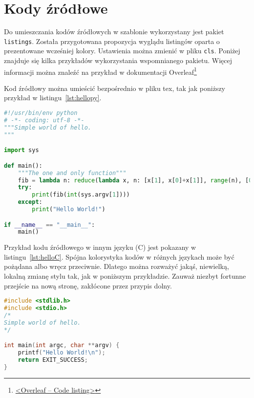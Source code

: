 
\section{Kody źródłowe}
Do umieszczania kodów źródłowych w szablonie wykorzystany jest pakiet \texttt{listings}. Została przygotowana propozycja wyglądu listingów oparta o prezentowane wcześniej kolory. Ustawienia można zmienić w pliku \texttt{cls}. Poniżej znajduje się kilka przykładów wykorzystania wspomnianego pakietu. Więcej informacji można znaleźć na przykład w dokumentacji Overleaf\footnote{\href{https://www.overleaf.com/learn/latex/code_listing}{<Overleaf -- Code listing>}}

Kod źródłowy można umieścić bezpośrednio w pliku tex, tak jak poniższy przykład w listingu~\ref{lst:hellopy}.

\begin{lstlisting}[language=Python,
    caption={Prosty program w języku Python},
    label={lst:hellopy}]
#!/usr/bin/env python
# -*- coding: utf-8 -*-
"""Simple world of hello.
"""

import sys

def main():
    """The one and only function"""
    fib = lambda n: reduce(lambda x, n: [x[1], x[0]+x[1]], range(n), [0, 1])[0]
    try:
        print(fib(int(sys.argv[1])))
    except:
        print("Hello World!")

if __name__ == "__main__":
    main()
\end{lstlisting}

Przykład kodu źródłowego w innym języku (C) jest pokazany w listingu~\ref{lst:helloC}. Spójna kolorystyka kodów w różnych językach może być pożądana albo wręcz przeciwnie. Dlatego można rozważyć jakąś, niewielką, lokalną zmianę stylu tak, jak w poniższym przykładzie. Zauważ niezbyt fortunne przejście na nową stronę, zakłócone przez przypis dolny.

\begin{lstlisting}[language=C,
    backgroundcolor=\color{EEGold!5!white},
    caption={Prosty program w języku C},
    label={lst:helloC}]
#include <stdlib.h>
#include <stdio.h>
/*
Simple world of hello.
*/

int main(int argc, char **argv) {
	printf("Hello World!\n");
	return EXIT_SUCCESS;
}
\end{lstlisting}

